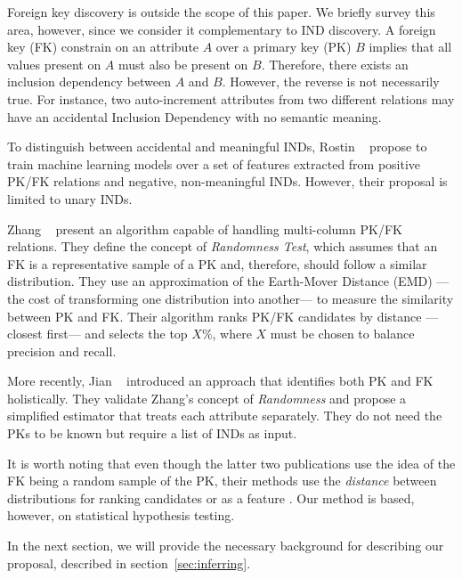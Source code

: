 Foreign key discovery is outside the scope of this paper.
We briefly survey this area, however, since we consider it complementary to
IND discovery. A foreign key (FK) constrain on an attribute
$A$ over a primary key (PK) $B$ implies that all values present on $A$ must also be
present on $B$.
Therefore, there exists an inclusion dependency between $A$ and $B$.
However, the reverse is not necessarily true. For instance, two auto-increment attributes from
two different relations may have an accidental Inclusion Dependency with no semantic meaning.

To distinguish between accidental and meaningful INDs, Rostin \etal~\cite{Rostin2009} propose to
train machine learning models over a set of features extracted from positive PK/FK relations and
negative, non-meaningful INDs. However, their proposal is limited to unary INDs.

Zhang \etal~\cite{Zhang2010} present an algorithm capable of handling multi-column PK/FK relations.
They define the concept of \emph{Randomness Test}, which assumes that an FK is a representative
sample of a PK and, therefore, should follow a similar distribution. They use an approximation of the
Earth-Mover Distance (EMD) ---the cost of transforming one distribution into another--- to measure the
similarity between PK and FK.
Their algorithm ranks PK/FK candidates by distance ---closest first--- and selects the top $X\%$,
where $X$ must be chosen to balance precision and recall.

More recently, Jian \etal~\cite{jiang_holistic_2020} introduced an approach that identifies
both PK and FK holistically. They validate Zhang's concept of \emph{Randomness} and propose a simplified
estimator that treats each attribute separately. They do not need the PKs to be known but require a list of
INDs as input.

It is worth noting that even though the latter two publications use the idea of the FK being a random
sample of the PK, their methods use the \emph{distance} between distributions for
ranking candidates \cite{Zhang2010} or as a feature \cite{jiang_holistic_2020}.
Our method is based, however, on statistical hypothesis testing\footnotemark.


\medskip

In the next section, we will provide the necessary background for describing our proposal, described
in section~\ref{sec:inferring}.

